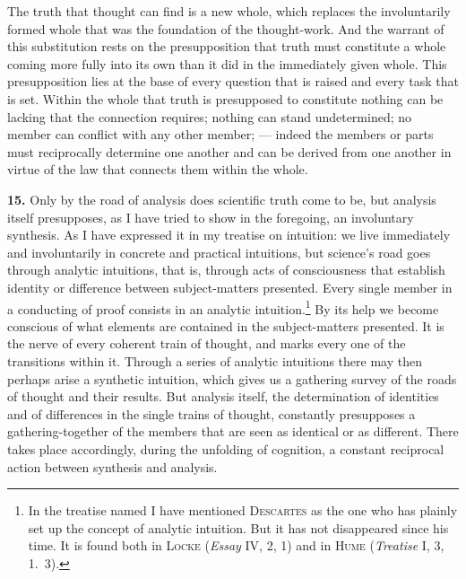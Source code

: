 \documentclass[12pt]{book}
\newcommand{\hnum}[1]{\textbf{#1.}\enspace}
\newcommand{\opage}[1]{\marginnote{\footnotesize\textit{[#1]}}}
\begin{document}
The truth that thought can find is a new whole, which replaces the involuntarily
formed whole that was the foundation of the thought-work. And the warrant of this
substitution rests on the presupposition that truth must constitute a whole
coming more fully into its own than it did in the immediately given whole. This
presupposition lies at the base of every question that is raised and every task
that is set. Within the whole that truth is presupposed to constitute nothing can
be lacking that the connection requires; nothing can stand undetermined; no member
can conflict with any other member; --- indeed the members or parts must
reciprocally determine one another and can be derived from one another in virtue
of the law that connects them within the whole.

\hnum{15} Only by the road of analysis does scientific truth come to be, but
analysis itself presupposes, as I have tried to show in the foregoing, an
involuntary synthesis. As I have expressed it in my treatise on intuition: we
live immediately \opage{40}and involuntarily in concrete and practical intuitions, but
science's road goes through analytic intuitions, that is, through acts of
consciousness that establish identity or difference between subject-matters
presented. Every single member in a conducting of proof consists in an analytic
intuition.\footnote{In the treatise named I have mentioned \textsc{Descartes} as
the one who has plainly set up the concept of analytic intuition. But it has not
disappeared since his time. It is found both in \textsc{Locke} (\textit{Essay}
IV, 2, 1) and in \textsc{Hume} (\textit{Treatise} I, 3, 1.\ 3).} By its help we
become conscious of what elements are contained in the subject-matters presented.
It is the nerve of every coherent train of thought, and marks every one of the
transitions within it. Through a series of analytic intuitions there may then
perhaps arise a synthetic intuition, which gives us a gathering survey of the
roads of thought and their results. But analysis itself, the determination of
identities and of differences in the single trains of thought, constantly
presupposes a gathering-together of the members that are seen as identical or as
different. There takes place accordingly, during the unfolding of cognition, a
constant reciprocal action between synthesis and analysis.
\end{document}

